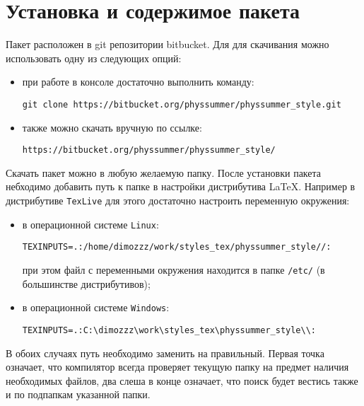 \section{Установка и содержимое пакета}

Пакет расположен в git репозитории bitbucket. Для для скачивания можно использовать одну из следующих
опций:
\begin{itemize}
    \item при работе в консоле достаточно выполнить команду:
        \begin{lstlisting}[gobble = 7]
            git clone https://bitbucket.org/physsummer/physsummer_style.git
        \end{lstlisting}
    \item также можно скачать вручную по ссылке:
        \begin{lstlisting}[gobble = 7]
            https://bitbucket.org/physsummer/physsummer_style/
        \end{lstlisting}
\end{itemize}


Скачать пакет можно в любую желаемую папку. После установки пакета небходимо добавить путь к папке в
настройки дистрибутива \LaTeX. Например в дистрибутиве \texttt{TexLive} для этого достаточно настроить
переменную окружения:

\begin{itemize}
    \item в операционной системе \texttt{Linux}:
        \begin{lstlisting}[gobble = 7]
            TEXINPUTS=.:/home/dimozzz/work/styles_tex/physsummer_style//:
        \end{lstlisting}
        при этом файл с переменными окружения находится в папке \texttt{/etc/} (в большинстве дистрибутивов);
    \item в операционной системе \texttt{Windows}:
        \begin{lstlisting}[gobble = 7]
            TEXINPUTS=.:C:\dimozzz\work\styles_tex\physsummer_style\\:
        \end{lstlisting}
\end{itemize}

В обоих случаях путь необходимо заменить на правильный. Первая точка означает, что компилятор всегда
проверяет текущую папку на предмет наличия необходимых файлов, два слеша в конце означает, что поиск
будет вестись также и по подпапкам указанной папки.